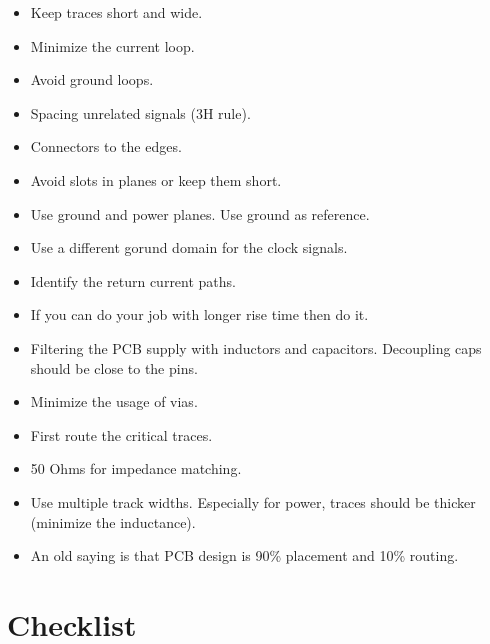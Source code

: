\documentclass[final]{cubedoc}
\begin{document}
	\begin{itemize}
		\item Keep traces short and wide. 
		\item Minimize the current loop.
		\item Avoid ground loops.
		\item Spacing unrelated signals (3H rule).
		\item Connectors to the edges.
		\item Avoid slots in planes or keep them short.
		\item Use ground and power planes. Use ground as reference.
		\item Use a different gorund domain for the clock signals.
		\item Identify the return current paths. 
		\item If you can do your job with longer rise time then do it.
		\item Filtering the PCB supply with inductors and capacitors. Decoupling caps should be close to the pins.
		\item Minimize the usage of vias.
		\item First route the critical traces.
		\item 50 Ohms for impedance matching.
		\item Use multiple track widths. Especially for power, traces should be thicker (minimize the inductance).
		\item An old saying is that PCB design is 90\% placement and 10\% routing.
	\end{itemize}
	
	\section{Checklist}
	
\end{document}
